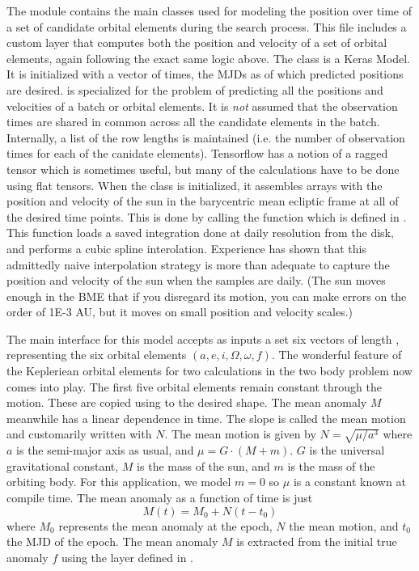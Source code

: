 The module  contains the main classes used for modeling the position over time
of a set of candidate orbital elements during the search process.
This file includes a custom layer  that computes both the position 
and velocity of a set of orbital elements, again following the exact same logic above.
The class  is a Keras Model.
It is initialized with a vector of times, the MJDs as of which predicted positions are desired.
 is specialized for the problem of predicting all the positions and velocities of a batch or orbital elements.
It is \textit{not} assumed that the observation times are shared in common across all the candidate elements in the batch.
Internally, a list of the row lengths is maintained (i.e. the number of observation times for each of the canidate elements).
Tensorflow has a notion of a ragged tensor which is sometimes useful, but many of the calculations have to be done using flat tensors.
When the class is initialized, it assembles arrays with the position and velocity of the sun 
in the barycentric mean ecliptic frame at all of the desired time points.  
This is done by calling the function  which is defined in .
This function loads a saved integration done at daily resolution from the disk, and performs a cubic spline interolation.
Experience has shown that this admittedly naive interpolation strategy 
is more than adequate to capture the position and velocity of the sun when the samples are daily.
(The sun moves enough in the BME that if you disregard its motion, you can make errors on the order of 1E-3 AU, 
but it moves on small position and velocity scales.)

The main interface for this model accepts as inputs a set six vectors of length , 
representing the six orbital elements $(a, e, i, \Omega, \omega, f)$.
The wonderful feature of the Kepleriean orbital elements for two calculations in the two body problem now comes into play.
The first five orbital elements remain constant through the motion.
These are copied using  to the desired shape.
The mean anomaly $M$ meanwhile has a linear dependence in time.
The slope is called the mean motion and customarily written with $N$.  The mean motion is given by 
$N = \sqrt{\mu / a^3}$
where $a$ is the semi-major axis as usual, and $\mu = G \cdot (M + m)$.
$G$ is the universal gravitational constant, $M$ is the mass of the sun, and $m$ is the mass of the orbiting body.
For this application, we model $m=0$ so $\mu$ is a constant known at compile time.
The mean anomaly as a function of time is just
$$M(t) = M_0 + N(t - t_0)$$
where $M_0$ represents the mean anomaly at the epoch, $N$ the mean motion, and $t_0$ the MJD of the epoch.
The mean anomaly $M$ is extracted from the initial true anomaly $f$ using the layer  defined in .

